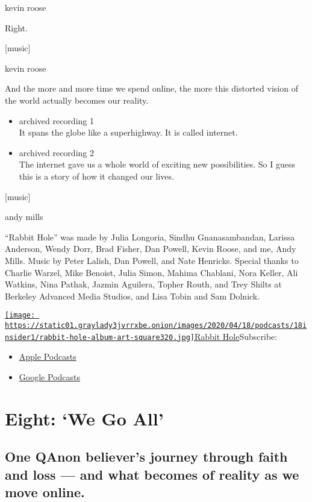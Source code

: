 kevin roose

Right.

{[}music{]}

kevin roose

And the more and more time we spend online, the more this distorted
vision of the world actually becomes our reality.

\begin{itemize}
\item
  archived recording 1\\
  It spans the globe like a superhighway. It is called internet.
\item
  archived recording 2\\
  The internet gave us a whole world of exciting new possibilities. So I
  guess this is a story of how it changed our lives.
\end{itemize}

{[}music{]}

andy mills

``Rabbit Hole'' was made by Julia Longoria, Sindhu Gnanasambandan,
Larissa Anderson, Wendy Dorr, Brad Fisher, Dan Powell, Kevin Roose, and
me, Andy Mills. Music by Peter Lalish, Dan Powell, and Nate Henricks.
Special thanks to Charlie Warzel, Mike Benoist, Julia Simon, Mahima
Chablani, Nora Keller, Ali Watkins, Nina Pathak, Jazmin Aguilera, Topher
Routh, and Trey Shilts at Berkeley Advanced Media Studios, and Lisa
Tobin and Sam Dolnick.

\href{https://www.nytimes3xbfgragh.onion/column/rabbit-hole}{\texttt{[image: https://static01.graylady3jvrrxbe.onion/images/2020/04/18/podcasts/18insider1/rabbit-hole-album-art-square320.jpg]}Rabbit
Hole}Subscribe:

\begin{itemize}
\tightlist
\item
  \href{https://itunes.apple.com/us/podcast/id1507423923}{Apple
  Podcasts}
\item
  \href{https://podcasts.google.com/?feed=aHR0cHM6Ly9yc3MuYXJ0MTkuY29tL3JhYmJpdC1ob2xl\&ved=0CAAQ4aUDahcKEwjY6Y38xujoAhUAAAAAHQAAAAAQDw}{Google
  Podcasts}
\end{itemize}

\hypertarget{eight-we-go-all-1}{%
\section{Eight: `We Go All'}\label{eight-we-go-all-1}}

\hypertarget{one-qanon-believers-journey-through-faith-and-loss--and-what-becomes-of-reality-as-we-move-online-1}{%
\subsection{One QAnon believer's journey through faith and loss --- and
what becomes of reality as we move
online.}\label{one-qanon-believers-journey-through-faith-and-loss--and-what-becomes-of-reality-as-we-move-online-1}}

